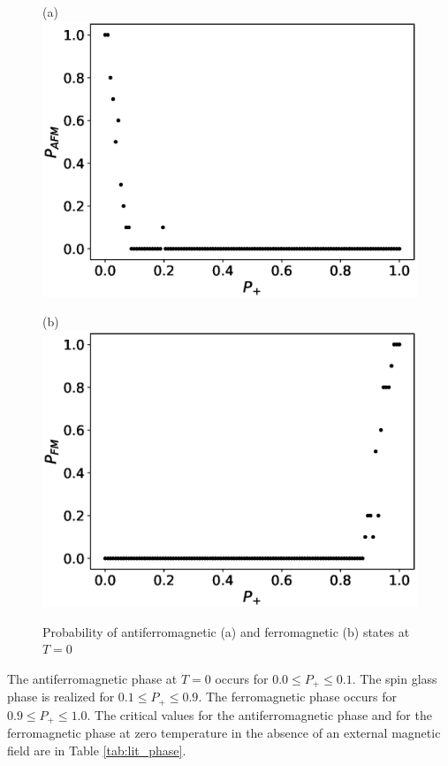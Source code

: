 \documentclass[preprint,12pt]{elsarticle}
\begin{document}
\begin{figure}[H]
	\begin{minipage}[h]{0.45\linewidth}
		\centering (a)
		\includegraphics[width=1\linewidth]{images/P_AFM_Mmax.eps}
	\end{minipage}
	\hfill
	\begin{minipage}[h]{0.45\linewidth}
		\centering (b)
		\includegraphics[width=1\linewidth]{images/P_FM_Mmax.eps}
	\end{minipage}
	\caption{Probability of antiferromagnetic (a) and ferromagnetic (b) states at \( T = 0 \)}
	\label{fig:P_AFM_FM_Mmax}
\end{figure}

The antiferromagnetic phase at $T = 0$ occurs for $0.0 \leq P_+ \leq 0.1$. The spin glass phase is realized for $0.1 \leq P_+ \leq 0.9$. The ferromagnetic phase occurs for $0.9 \leq P_+ \leq 1.0$. The critical values for the antiferromagnetic phase and for the ferromagnetic phase at zero temperature in the absence of an external magnetic field are in Table \ref{tab:lit_phase}.
\end{document}
